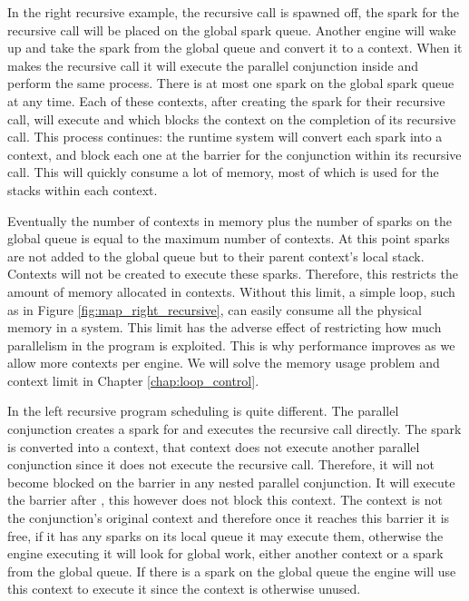 In the right recursive example,
the recursive call is spawned off,
the spark for the recursive call will be placed on the global spark queue.
Another engine will wake up and take the spark from the global queue and
convert it to a context.
When it makes the recursive call it will execute the parallel conjunction
inside and perform the same process.
There is at most one spark on the global spark queue at any time.
Each of these contexts,
after creating the spark for their recursive call,
will execute  and
\joinandcontinue which blocks the context on the completion of
its recursive call.
This process continues:
the runtime system will convert each spark into a context,
and block each one at the barrier for the conjunction within its
recursive call.
This will quickly consume a lot of memory,
most of which is used for the stacks within each context.

Eventually the number of contexts in memory plus
the number of sparks on the global queue is equal to the maximum number of
contexts.
At this point sparks are not added to the global queue but to their parent
context's local stack.
Contexts will not be created to execute these sparks.
Therefore,
this restricts the amount of memory allocated in contexts.
Without this limit,
a simple loop, such as in Figure \ref{fig:map_right_recursive},
can easily consume all the physical memory in a system.
This limit has the adverse effect of restricting how much parallelism
in the program is exploited.
This is why performance improves as we allow more contexts per engine.
We will solve the memory usage problem and context limit in
Chapter \ref{chap:loop_control}.

In the left recursive program scheduling is quite different.
The parallel conjunction creates a spark for  and executes the
recursive call directly.
The spark is converted into a context,
that context does not execute another parallel conjunction since it does not
execute the recursive call.
Therefore, it will not become blocked on the \joinandcontinue barrier in any
nested parallel conjunction.
It will execute the barrier after ,
this however does not block this context.
The context is not the conjunction's original context and therefore once it
reaches this barrier it is free,
if it has any sparks on its local queue it may execute them,
otherwise the engine executing it will look for global work,
either another context or a spark from the global queue.
If there is a spark on the global queue the engine will use this context to
execute it since the context is otherwise unused.

